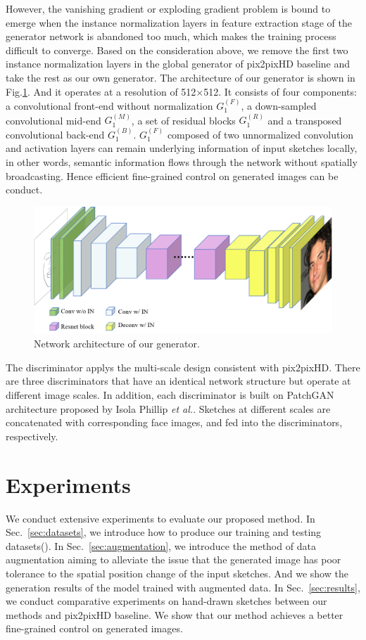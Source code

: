 \documentclass[10pt,twocolumn,letterpaper]{article}
\begin{document}
However, the vanishing gradient or exploding gradient problem is bound to emerge when the instance normalization layers in feature extraction stage of the generator network is abandoned too much, which makes the training process difficult to converge. 
Based on the consideration above, we remove the first two instance normalization layers in the global generator of pix2pixHD baseline and take the rest as our own generator. 
The architecture of our generator is shown in Fig.\ref{fig:our_generator}. And it operates at a resolution of 512×512. 
It consists of four components: a convolutional front-end without normalization $G_1^{(F)}$, a down-sampled convolutional mid-end $G_1^{(M)}$, a set of residual blocks $G_1^{(R)}$ and a transposed convolutional back-end $G_1^{(B)}$. 
$G_1^{(F)}$ composed of two unnormalized convolution and activation layers can remain underlying information of input sketches locally, in other words, semantic information flows through the network without spatially broadcasting. 
Hence efficient fine-grained control on generated images can be conduct. %
\begin{figure}[htbp]
	\centering
	\includegraphics[width=0.8 \textwidth]{our_model_G.png}
	\caption{Network architecture of our generator. }
	\label{fig:our_generator}
\end{figure}

The discriminator applys the multi-scale design consistent with pix2pixHD. 
There are three discriminators that have an identical network structure but operate at different image scales. 
In addition, each discriminator is built on PatchGAN\cite{pix2pix} architecture proposed by Isola Phillip \textit{et al.}. Sketches at different scales are concatenated with corresponding face images, and fed into the discriminators, respectively. 


\section{Experiments}
We conduct extensive experiments to evaluate our proposed method.
In Sec.~\ref{sec:datasets}, we introduce how to produce our training and testing datasets(). 
In Sec.~\ref{sec:augmentation}, we introduce the method of data augmentation aiming to alleviate the issue that the generated image has poor tolerance to the spatial position change of the input sketches. And we show the generation results of the model trained with augmented data. 
In Sec.~\ref{sec:results}, we conduct comparative experiments on hand-drawn sketches between our methods and pix2pixHD baseline. We show that our method achieves a better fine-grained control on generated images.
\end{document}
